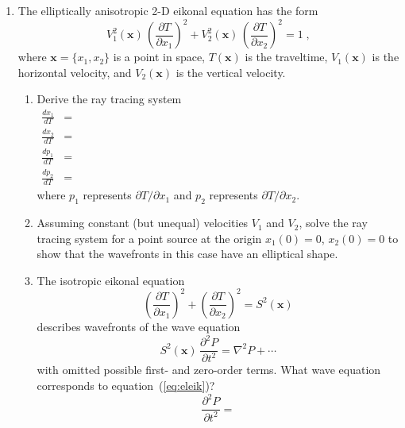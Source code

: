 \begin{enumerate}
\item The elliptically anisotropic 2-D eikonal
  equation has the form
  \begin{equation}
    \label{eq:eleik}
    V_1^2(\mathbf{x})\,\left(\frac{\partial T}{\partial x_1}\right)^2 +
    V_2^2(\mathbf{x})\,\left(\frac{\partial T}{\partial x_2}\right)^2 = 1\;,
  \end{equation}
  where $\mathbf{x}=\{x_1,x_2\}$ is a point in space, $T(\mathbf{x})$
  is the traveltime, $V_1(\mathbf{x})$ is the horizontal velocity, and
  $V_2(\mathbf{x})$ is the vertical velocity.
  \begin{enumerate}
  \item Derive the ray tracing system
    \begin{eqnarray}
      \label{eq:xt}
      \frac{d x_1}{d T} & = & \hspace{5in} \\
      \label{eq:zt}
      \frac{d x_2}{d T} & = & \\
      \label{eq:pxt}
      \frac{d p_1}{d T} & = & \\
      \label{eq:pzt}
      \frac{d p_2}{d T} & = & 
    \end{eqnarray}
    where $p_1$ represents $\partial T/\partial x_1$ and 
    $p_2$ represents $\partial T/\partial x_2$.
  \item Assuming constant (but unequal) velocities $V_1$ and $V_2$,
    solve the ray tracing system for a point source at the origin
    $x_1(0)=0$, $x_2(0)=0$ to show that the wavefronts in this case
    have an elliptical shape.
  \item The isotropic eikonal equation
    \begin{equation}
      \label{eq:iso}
      \left(\frac{\partial T}{\partial x_1}\right)^2 +
      \left(\frac{\partial T}{\partial x_2}\right)^2 = S^2(\mathbf{x})
    \end{equation}
    describes wavefronts of the wave equation
    \begin{equation}
      \label{eq:isowave}
    S^2(\mathbf{x})\,\frac{\partial^2 P}{\partial t^2} =
    \nabla^2 P + \cdots
  \end{equation}
  with omitted possible first- and zero-order terms. 
  What wave equation corresponds to equation~(\ref{eq:eleik})?
  \begin{equation}
    {\frac{\partial^2 P}{\partial t^2}} =
    \label{eq:anisowave}
  \end{equation}
  \end{enumerate}
\end{enumerate}


